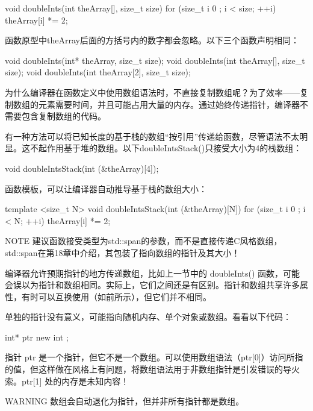 \begin{cpp}
void doubleInts(int theArray[], size_t size)
{
    for (size_t i { 0 }; i < size; ++i) { theArray[i] *= 2; }
}
\end{cpp}

函数原型中theArray后面的方括号内的数字都会忽略。以下三个函数声明相同：

\begin{cpp}
void doubleInts(int* theArray, size_t size);
void doubleInts(int theArray[], size_t size);
void doubleInts(int theArray[2], size_t size);
\end{cpp}

为什么编译器在函数定义中使用数组语法时，不直接复制数组呢？为了效率——复制数组的元素需要时间，并且可能占用大量的内存。通过始终传递指针，编译器不需要包含复制数组的代码。

有一种方法可以将已知长度的基于栈的数组“按引用”传递给函数，尽管语法不太明显。这不起作用基于堆的数组。以下doubleIntsStack()只接受大小为4的栈数组：

\begin{cpp}
void doubleIntsStack(int (&theArray)[4]);
\end{cpp}

函数模板，可以让编译器自动推导基于栈的数组大小：

\begin{cpp}
template <size_t N>
void doubleIntsStack(int (&theArray)[N])
{
    for (size_t i { 0 }; i < N; ++i) { theArray[i] *= 2; }
}
\end{cpp}

\begin{myNotic}{NOTE}
建议函数接受类型为std::span的参数，而不是直接传递C风格数组，std::span在第18章中介绍，其包装了指向数组的指针及其大小！
\end{myNotic}


编译器允许预期指针的地方传递数组，比如上一节中的 doubleInts() 函数，可能会误以为指针和数组相同。实际上，它们之间还是有区别。指针和数组共享许多属性，有时可以互换使用（如前所示），但它们并不相同。

单独的指针没有意义，可能指向随机内存、单个对象或数组。看看以下代码：

\begin{cpp}
int* ptr { new int };
\end{cpp}

指针 ptr 是一个指针，但它不是一个数组。可以使用数组语法（ptr[0]）访问所指的值，但这样做在风格上有问题，将数组语法用于非数组指针是引发错误的导火索。ptr[1] 处的内存是未知内容！

\begin{myWarning}{WARNING}
数组会自动退化为指针，但并非所有指针都是数组。
\end{myWarning}











